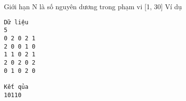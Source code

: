 Giới hạn  
N là số nguyên dương trong phạm vi [1, 30]
   Ví dụ  
\begin{verbatim}
Dữ liệu
5
0 2 0 2 1 
2 0 0 1 0 
1 1 0 2 1 
2 0 2 0 2 
0 1 0 2 0

Kết qủa
10110

\end{verbatim}